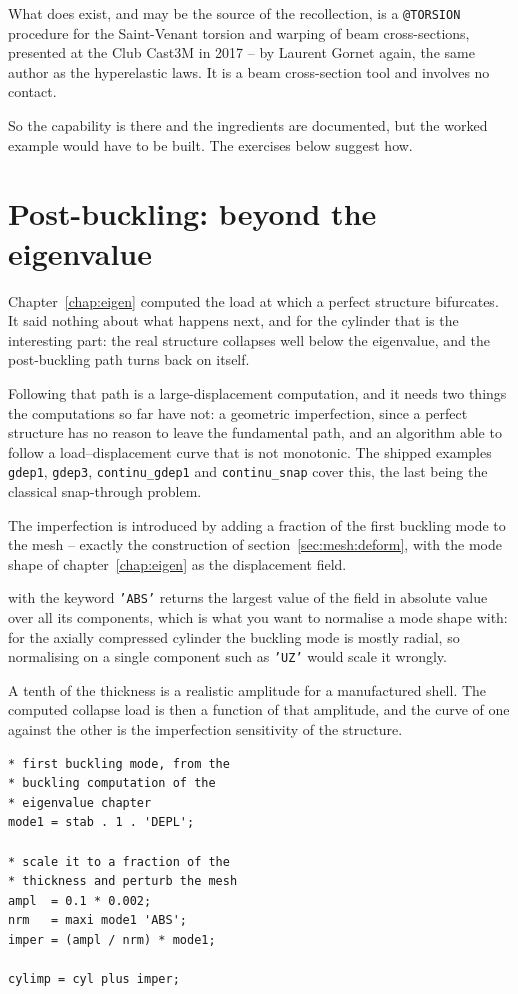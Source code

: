 What does exist, and may be the source of the recollection, is a
\texttt{@TORSION} procedure for the Saint-Venant torsion and warping of beam
cross-sections, presented at the Club Cast3M in 2017 -- by Laurent Gornet
again, the same author as the hyperelastic laws. It is a beam
cross-section tool and involves no contact.

So the capability is there and the ingredients are documented, but the worked
example would have to be built. The exercises below suggest how.

\section{Post-buckling: beyond the eigenvalue}

Chapter~\ref{chap:eigen} computed the load at which a perfect structure
bifurcates. It said nothing about what happens next, and for the cylinder
that is the interesting part: the real structure collapses well below the
eigenvalue, and the post-buckling path turns back on itself.

%
%
Following that path is a large-displacement computation, and it needs two
things the computations so far have not: a geometric imperfection, since a
perfect structure has no reason to leave the fundamental path, and an
algorithm able to follow a load--displacement curve that is not monotonic.
The shipped examples \texttt{gdep1}, \texttt{gdep3}, \texttt{continu\_gdep1}
and \texttt{continu\_snap} cover this, the last being the classical
snap-through problem.

\begin{castemcom}
The imperfection is introduced by adding a fraction of the first buckling
mode to the mesh -- exactly the  construction of
section~\ref{sec:mesh:deform}, with the mode shape of
chapter~\ref{chap:eigen} as the displacement field.

 with the keyword \texttt{'ABS'} returns the largest value of the
field in absolute value over all its components, which is what you want to
normalise a mode shape with: for the axially compressed cylinder the buckling
mode is mostly radial, so normalising on a single component such as
\texttt{'UZ'} would scale it wrongly.

A tenth of the thickness is a realistic amplitude for a manufactured shell.
The computed collapse load is then a function of that amplitude, and the
curve of one against the other is the imperfection sensitivity of the
structure.
\end{castemcom}
\begin{castemlines}
\begin{verbatim}
* first buckling mode, from the
* buckling computation of the
* eigenvalue chapter
mode1 = stab . 1 . 'DEPL';

* scale it to a fraction of the
* thickness and perturb the mesh
ampl  = 0.1 * 0.002;
nrm   = maxi mode1 'ABS';
imper = (ampl / nrm) * mode1;

cylimp = cyl plus imper;
\end{verbatim}
\end{castemlines}

